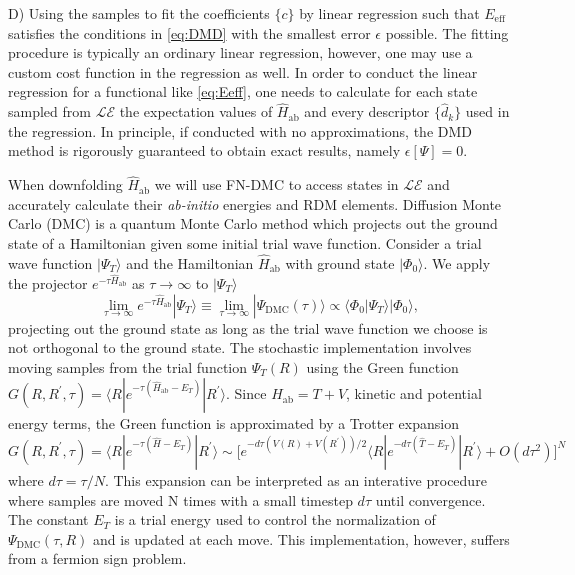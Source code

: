 \documentclass[12pt]{article}
\begin{document}
D) Using the samples to fit the coefficients $\{c\}$ by linear regression such that $E_\text{eff}$ satisfies the conditions in \eqref{eq:DMD} with the smallest error $\epsilon$ possible. 
The fitting procedure is typically an ordinary linear regression, however, one may use a custom cost function in the regression as well. 
In order to conduct the linear regression for a functional like \eqref{eq:Eeff}, one needs to calculate for each state sampled from $\mathcal{LE}$ the expectation values of $\hat{H}_\text{ab}$ and every descriptor $\{\hat{d}_k\}$ used in the regression.
In principle, if conducted with no approximations, the DMD method is rigorously guaranteed to obtain exact results, namely $\epsilon[\Psi] = 0$.

When downfolding $\hat{H}_\text{ab}$ we will use FN-DMC to access states in $\mathcal{LE}$ and accurately calculate their \textit{ab-initio} energies and RDM elements.
Diffusion Monte Carlo (DMC) is a quantum Monte Carlo method which projects out the ground state of a Hamiltonian given some initial trial wave function.
Consider a trial wave function $|\Psi_T\rangle$ and the Hamiltonian $\hat{H}_\text{ab}$ with ground state $|\Phi_0\rangle$. We apply the projector $e^{-\tau \hat{H}_\text{ab}}$ as $\tau \rightarrow \infty$ to $|\Psi_T \rangle$
\begin{equation}
\lim_{\tau \rightarrow \infty} e^{-\tau \hat{H}_\text{ab}} |\Psi_T\rangle 
\equiv \lim_{\tau \rightarrow \infty} |\Psi_\text{DMC}(\tau)\rangle \propto \langle \Phi_0|\Psi_T\rangle |\Phi_0\rangle,
\end{equation}
projecting out the ground state as long as the trial wave function we choose is not orthogonal to the ground state. 
The stochastic implementation involves moving samples from the trial function $\Psi_T(R)$ using the Green function $G(R, R^\prime, \tau) = \langle R | e^{-\tau(\hat{H}_\text{ab} - E_T)} | R^\prime \rangle$. Since $H_\text{ab} = T + V$, kinetic and potential energy terms, the Green function is approximated by a Trotter expansion $G(R, R^\prime, \tau) = \langle R | e^{-\tau(\hat{H} - E_T)} | R^\prime \rangle \sim \Big[e^{-d\tau(V(R) + V(R^\prime))/2} \langle R| e^{-d\tau(\hat{T} - E_T)}|R^\prime \rangle + O(d\tau^2) \Big]^N $ where $d\tau = \tau/N$.
This expansion can be interpreted as an interative procedure where samples are moved N times with a small timestep $d\tau$ until convergence.
The constant $E_T$ is a trial energy used to control the normalization of $\Psi_\text{DMC}(\tau, R)$ and is updated at each move.
This implementation, however, suffers from a fermion sign problem. 
\end{document}
